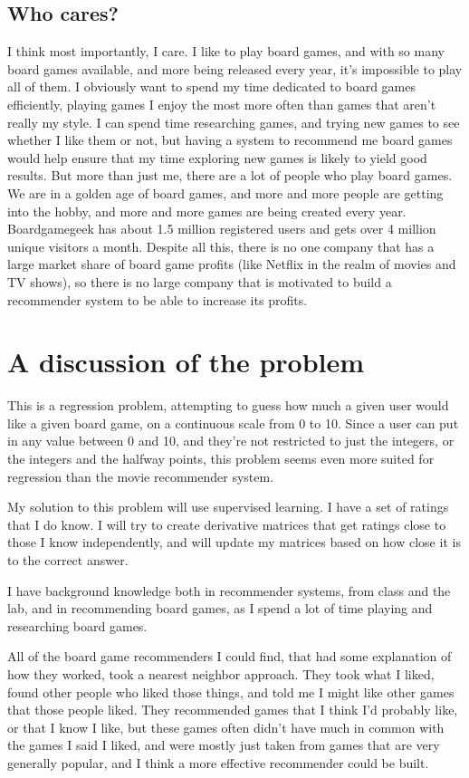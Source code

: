 \documentclass[11pt]{article}
\begin{document}
\subsection{Who cares?}
I think most importantly, I care. I like to play board games, and with so many board games available, and more being released every year, it's impossible to play all of them. I obviously want to spend my time dedicated to board games efficiently, playing games I enjoy the most more often than games that aren't really my style. I can spend time researching games, and trying new games to see whether I like them or not, but having a system to recommend me board games would help ensure that my time exploring new games is likely to yield good results. But more than just me, there are a lot of people who play board games. We are in a golden age of board games, and more and more people are getting into the hobby, and more and more games are being created every year. Boardgamegeek has about 1.5 million registered users and gets over 4 million unique visitors a month. Despite all this, there is no one company that has a large market share of board game profits (like Netflix in the realm of movies and TV shows), so there is no large company that is motivated to build a recommender system to be able to increase its profits.

\section{A discussion of the problem}
This is a regression problem, attempting to guess how much a given user would like a given board game, on a continuous scale from 0 to 10. Since a user can put in any value between 0 and 10, and they're not restricted to just the integers, or the integers and the halfway points, this problem seems even more suited for regression than the movie recommender system.

My solution to this problem will use supervised learning. I have a set of ratings that I do know. I will try to create derivative matrices that get ratings close to those I know independently, and will update my matrices based on how close it is to the correct answer.

I have background knowledge both in recommender systems, from class and the lab, and in recommending board games, as I spend a lot of time playing and researching board games.

All of the board game recommenders I could find, that had some explanation of how they worked, took a nearest neighbor approach. They took what I liked, found other people who liked those things, and told me I might like other games that those people liked. They recommended games that I think I'd probably like, or that I know I like, but these games often didn't have much in common with the games I said I liked, and were mostly just taken from games that are very generally popular, and I think a more effective recommender could be built.
\end{document}
